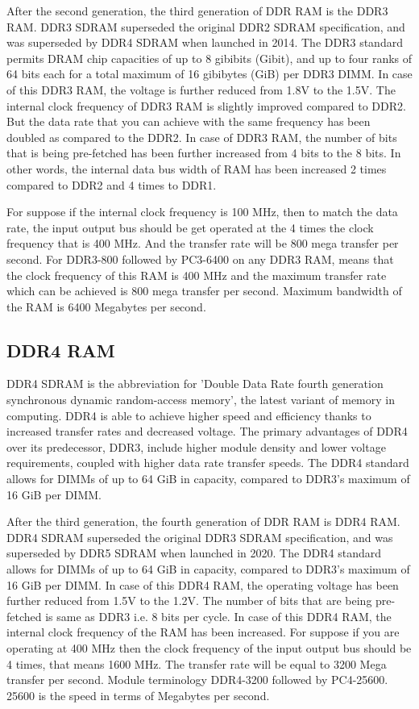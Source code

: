After the second generation, the third generation of DDR RAM is the DDR3 RAM. DDR3 SDRAM superseded the original DDR2 SDRAM specification, and was superseded by DDR4 SDRAM when launched in 2014. The DDR3 standard permits DRAM chip capacities of up to 8 gibibits (Gibit), and up to four ranks of 64 bits each for a total maximum of 16 gibibytes (GiB) per DDR3 DIMM. In case of this DDR3 RAM, the voltage is further reduced from 1.8V to the 1.5V. The internal clock frequency of DDR3 RAM is slightly improved compared to DDR2. But the data rate that you can achieve with the same frequency has been doubled as compared to the DDR2. In case of DDR3 RAM, the number of bits that is being pre-fetched has been further increased from 4 bits to the 8 bits. In other words, the internal data bus width of RAM has been increased 2 times compared to DDR2 and 4 times to DDR1.
\par For \eg suppose if the internal clock frequency is 100 MHz, then to match the data rate, the input output bus should be get operated at the 4 times the clock frequency that is 400 MHz. And the transfer rate will be 800 mega transfer per second. For \eg DDR3-800 followed by PC3-6400 on any DDR3 RAM, means that the clock frequency of this RAM is 400 MHz and the maximum transfer rate which can be achieved is 800 mega transfer per second. Maximum bandwidth of the RAM is 6400 Megabytes per second.

\subsection{DDR4 RAM}
DDR4 SDRAM is the abbreviation for 'Double Data Rate fourth generation synchronous dynamic random-access memory', the latest variant of memory in computing. DDR4 is able to achieve higher speed and efficiency thanks to increased transfer rates and decreased voltage. The primary advantages of DDR4 over its predecessor, DDR3, include higher module density and lower voltage requirements, coupled with higher data rate transfer speeds. The DDR4 standard allows for DIMMs of up to 64 GiB in capacity, compared to DDR3's maximum of 16 GiB per DIMM.

\par After the third generation, the fourth generation of DDR RAM is DDR4 RAM. DDR4 SDRAM superseded the original DDR3 SDRAM specification, and was superseded by DDR5 SDRAM when launched in 2020.
The DDR4 standard allows for DIMMs of up to 64 GiB in capacity, compared to DDR3's maximum of 16 GiB per DIMM. In case of this DDR4 RAM, the operating voltage has been further reduced from
1.5V to the 1.2V. The number of bits that are being pre-fetched is same as DDR3 i.e. 8 bits per cycle. In case of this DDR4 RAM, the internal clock frequency of the RAM has been increased.
For \eg suppose if you are operating at 400 MHz then the clock frequency of the input output bus should be 4 times, that means 1600 MHz. The transfer rate will be equal to 3200 Mega transfer per second. Module terminology \eg DDR4-3200 followed by PC4-25600. 25600 is the speed in terms of Megabytes per second.

